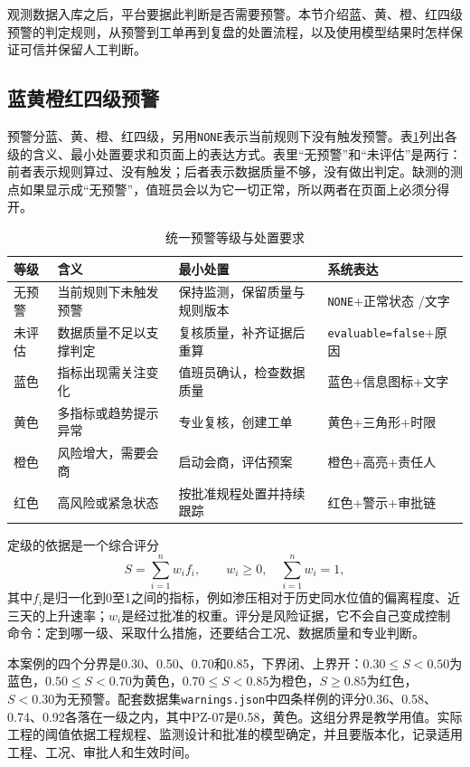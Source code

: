 观测数据入库之后，平台要据此判断是否需要预警。本节介绍蓝、黄、橙、红四级预警的判定规则，从预警到工单再到复盘的处置流程，以及使用模型结果时怎样保证可信并保留人工判断。

\subsection{蓝黄橙红四级预警}

预警分蓝、黄、橙、红四级，另用\texttt{NONE}表示当前规则下没有触发预警。表\ref{tab:warning-levels}列出各级的含义、最小处置要求和页面上的表达方式。表里“无预警”和“未评估”是两行：前者表示规则算过、没有触发；后者表示数据质量不够，没有做出判定。缺测的测点如果显示成“无预警”，值班员会以为它一切正常，所以两者在页面上必须分得开。

\begin{table}[htbp]
\centering
\caption{统一预警等级与处置要求}
\label{tab:warning-levels}
\begin{tabular}{p{1.8cm}p{3.7cm}p{4.3cm}p{3.1cm}}
\toprule
等级 & 含义 & 最小处置 & 系统表达 \\
\midrule
无预警 & 当前规则下未触发预警 & 保持监测，保留质量与规则版本 & \texttt{NONE}+正常状态 \slash 文字 \\
未评估 & 数据质量不足以支撑判定 & 复核质量，补齐证据后重算 & \texttt{evaluable=}\allowbreak\texttt{false}+原因 \\
蓝色 & 指标出现需关注变化 & 值班员确认，检查数据质量 & 蓝色+信息图标+文字 \\
黄色 & 多指标或趋势提示异常 & 专业复核，创建工单 & 黄色+三角形+时限 \\
橙色 & 风险增大，需要会商 & 启动会商，评估预案 & 橙色+高亮+责任人 \\
红色 & 高风险或紧急状态 & 按批准规程处置并持续跟踪 & 红色+警示+审批链 \\
\bottomrule
\end{tabular}
\end{table}

定级的依据是一个综合评分
\[
S=\sum_{i=1}^{n} w_i f_i,\qquad
w_i\ge 0,\quad \sum_{i=1}^{n}w_i=1,
\]
其中$f_i$是归一化到0至1之间的指标，例如渗压相对于历史同水位值的偏离程度、近三天的上升速率；$w_i$是经过批准的权重。评分是风险证据，它不会自己变成控制命令：定到哪一级、采取什么措施，还要结合工况、数据质量和专业判断。

本案例的四个分界是0.30、0.50、0.70和0.85，下界闭、上界开：$0.30\le S<0.50$为蓝色，$0.50\le S<0.70$为黄色，$0.70\le S<0.85$为橙色，$S\ge0.85$为红色，$S<0.30$为无预警。配套数据集\texttt{warnings.json}中四条样例的评分0.36、0.58、0.74、0.92各落在一级之内，其中PZ-07是0.58，黄色。这组分界是教学用值。实际工程的阈值依据工程规程、监测设计和批准的模型确定，并且要版本化，记录适用工程、工况、审批人和生效时间。

